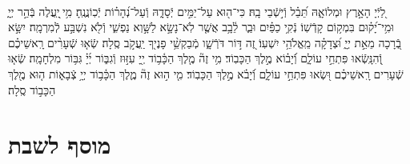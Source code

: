 \documentclass[twoside, openany, parskip=half, 11pt]{book}
\begin{document}
\begin{sometimes}

\\
%
לַ֭יְֿיָ הָאָ֣רֶץ וּמְלוֹאָ֑הּ תֵּ֝בֵ֗ל וְֿי֣שְֿׁבֵי בָֽהּ׃
כִּי־ה֖וּא עַל־יַמִּ֣ים יְֿסָדָ֑הּ וְֿעַל־נְ֝הָר֗וֹת יְֿכֽוֹנֲנֶֽהָ׃
מִ֥י ֖יַֽעֲלֶה בְּֿהַ֣ר יְיָ֑ וּמִ֥י־יָ֝ק֗וּם בִּמְק֥וֹם קָדְֿשֽׁוֹ׃
נְֿקִ֥י כַפַּ֗יִם וּבַ֢ר לֵ֫בָ֥ב אֲשֶׁ֤ר לֹֽא־נָשָׂ֣א לַשָּׁ֣וְא נַפְשִׁ֑י וְֿלֹ֖א נִשְׁבַּ֣ע לְֿמִרְמָֽה׃
יִשָּׂ֣א בְֿ֭רָכָה מֵאֵ֣ת יְיָ֑ וּ֝צְדָקָ֗ה מֵֽאֱלֹהֵ֥י יִשְׁעֽוֹ׃
זֶ֭ה דּ֣וֹר דֹּרְֿשָׁ֑ו מְֿבַקְשֵׁ֥֨י פָנֶי֖ךָ יַֽעֲקֹ֣ב סֶֽלָה׃
שְֿׂא֤וּ שְֿׁעָרִ֨ים רָֽאשֵׁיכֶ֗ם וְֿ֭הִנָּֽשְֿׂאוּ פִּתְחֵ֣י עוֹלָ֑ם וְֿ֝יָב֗וֹא מֶ֣לֶךְ הַכָּבֽוֹד׃
מִ֥י זֶה֘ מֶ֤לֶךְ הַכָּ֫ב֥וֹד יְ֖יָ עִזּ֣וּז וְֿגִבּ֑וֹר יְ֜יָ֗ גִּבּ֥וֹר מִלְחָמָֽה׃
שְֿׂא֤וּ שְֿׁעָרִים רָֽאשֵׁיכֶ֗ם וּ֭שְׂאוּ פִּתְחֵ֣י עוֹלָ֑ם וְֿ֝יָבֹ֗א מֶ֣לֶךְ הַכָּבֽוֹד׃
מִ֤י ה֣וּא זֶה֘ מֶ֢לֶךְ הַכָּ֫ב֥וֹד יְיָ֥ צְֿבָא֑וֹת ה֤וּא מֶ֖לֶךְ הַכָּב֣וֹד סֶֽלָה׃

\end{sometimes}



\etzchaim

\halfkaddish


\vspace{\baselineskip}


{\let\clearpage\relax
\chapter[מוסף לשבת]{ מוסף לשבת }}

\amidaopening{\shabbosshuva}{}

\end{document}
